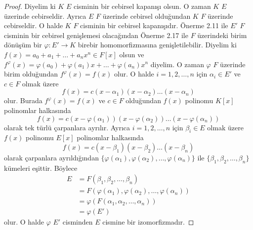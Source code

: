 \documentclass[draft]{article}
\theoremstyle{definition}
\theoremstyle{remark}
\begin{document}
    		\begin{proof}
    	        Diyelim ki $K$ $E$ cisminin bir cebirsel kapanışı olsun. O zaman $K$ $E$ üzerinde cebirseldir. Ayrıca $E$ $F$ üzerinde cebirsel olduğundan $K$ $F$ üzerinde cebirseldir. O halde $K$ $F$ cisminin bir cebirsel kapanışıdır. Önerme 2.11 ile $E'$ $F$ cisminin bir cebirsel genişlemesi olacağından Önerme 2.17 ile $F$ üzerindeki birim dönüşüm bir $\varphi: E' \to K$ birebir homomorfizmasına genişletilebilir. Diyelim ki $f(x) = a_0 + a_1 + \dots + a_nx^n \in F[x]$ olsun ve $f^\varphi(x) = \varphi(a_0) + \varphi(a_1)x + \dots + \varphi(a_n)x^n$ diyelim. O zaman $\varphi$ $F$ üzerinde birim olduğundan $f^\varphi(x) = f(x)$ olur. O halde $i = 1, 2, \dots, n$ için $\alpha_i \in E'$ ve $c \in F$ olmak üzere
    	        \begin{equation*}
    	            f(x) = c (x - \alpha_1) (x - \alpha_2) \dots (x - \alpha_n)
    	        \end{equation*}
    	        olur. Burada $f^\varphi(x) = f(x)$ ve $c \in F$ olduğundan $f(x)$ polinomu $K[x]$ polinomlar halkasında
    	        \begin{equation*}
    	            f(x) = c (x - \varphi(\alpha_1)) (x - \varphi(\alpha_2)) \dots (x - \varphi(\alpha_n))
    	        \end{equation*}
    	        olarak tek türlü çarpanlara ayrılır. Ayrıca $i = 1, 2, \dots, n$ için $\beta_i \in E$ olmak üzere $f(x)$ polinomu $E[x]$ polinomlar halkasında
    	        \begin{equation*}
    	            f(x) = c (x - \beta_1) (x - \beta_2) \dots (x - \beta_n)
    	        \end{equation*}
    	        olarak çarpanlara ayrıldığından $\{\varphi(\alpha_1), \varphi(\alpha_2), \dots, \varphi(\alpha_n)\}$ ile $\{\beta_1, \beta_2, \dots, \beta_n\}$ kümeleri eşittir. Böylece
    	        \begin{align*}
    	            E &= F(\beta_1, \beta_2, \dots, \beta_n)\\
    	            &= F(\varphi(\alpha_1), \varphi(\alpha_2), \dots, \varphi(\alpha_n))\\\
    	            &= \varphi(F(\alpha_1, \alpha_2, \dots, \alpha_n))\\
    	            &= \varphi(E')
    	        \end{align*}
    	        olur. O halde $\varphi$ $E'$ cisminden $E$ cismine bir izomorfizmadır.
    	    \end{proof}
	        
\end{document}
